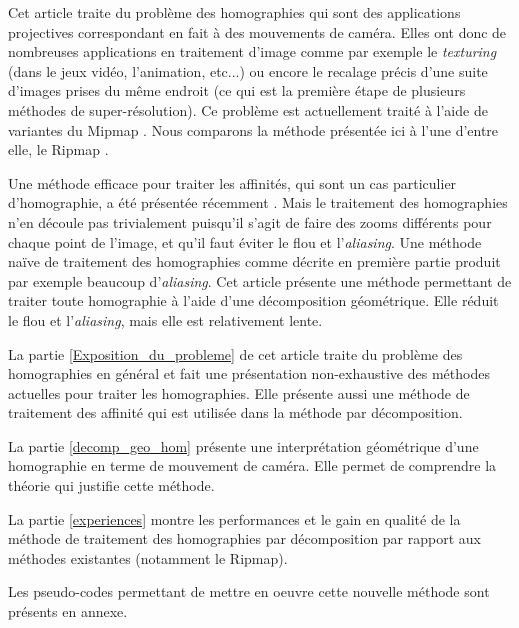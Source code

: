 	Cet article traite du problème des homographies qui sont des applications projectives correspondant en fait à des mouvements de caméra. Elles ont donc de nombreuses applications en traitement d'image comme par exemple le \emph{texturing} \cite{heckbert1983texture} (dans le jeux vidéo, l'animation, etc...) ou encore le recalage précis d'une suite d'images prises du même endroit \cite{brown2007automatic} (ce qui est la première étape de plusieurs méthodes de super-résolution). Ce problème est actuellement traité à l'aide de variantes du Mipmap \cite{williams1983pyramidal}. Nous comparons la méthode présentée ici à l'une d'entre elle, le Ripmap \cite{akenine2008real}.

	Une méthode efficace pour traiter les affinités, qui sont un cas particulier d'homographie, a été présentée récemment \cite{szeliski2010high}. Mais le traitement des homographies n'en découle pas trivialement puisqu'il s'agit de faire des zooms différents pour chaque point de l'image, et qu'il faut éviter le flou et l'\emph{aliasing}. Une méthode naïve de traitement des homographies comme décrite en première partie produit par exemple beaucoup d'\emph{aliasing}. Cet article présente une méthode permettant de traiter toute homographie à l'aide d'une décomposition géométrique. Elle réduit le flou et l'\emph{aliasing}, mais elle est relativement lente.

	La partie \ref{Exposition_du_probleme} de cet article traite du problème des homographies en général et fait une présentation non-exhaustive des méthodes actuelles pour traiter les homographies. Elle présente aussi une méthode de traitement des affinité qui est utilisée dans la méthode par décomposition.

	La partie \ref{decomp_geo_hom} présente une interprétation géométrique d'une homographie en terme de mouvement de caméra. Elle permet de comprendre la théorie qui justifie cette méthode.

	La partie \ref{experiences} montre les performances et le gain en qualité de la méthode de traitement des homographies par décomposition par rapport aux méthodes existantes (notamment le Ripmap).

	Les pseudo-codes permettant de mettre en oeuvre cette nouvelle méthode sont présents en annexe.
